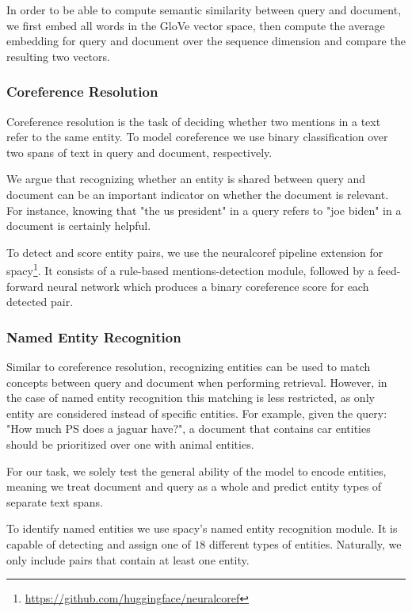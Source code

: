 In order to be able to compute semantic similarity between query and document, we first embed all words in the GloVe \cite{pennington2014glove} vector space, then compute the average embedding for query and document over the sequence dimension and compare the resulting two vectors.

\subsubsection{Coreference Resolution}
Coreference resolution is the task of deciding whether two mentions in a text refer to the same entity. To model coreference we use binary classification over two spans of text in query and document, respectively.

We argue that recognizing whether an entity is shared between query and document can be an important indicator on whether the document is relevant. For instance, knowing that "the us president" in a query refers to "joe biden" in a document is certainly helpful.

To detect and score entity pairs, we use the neuralcoref pipeline extension for spacy\footnote{\url{https://github.com/huggingface/neuralcoref}}. It consists of a rule-based mentions-detection module, followed by a feed-forward neural network which produces a binary coreference score for each detected pair.

\subsubsection{Named Entity Recognition}
Similar to coreference resolution, recognizing entities can be used to match concepts between query and document when performing retrieval. However, in the case of named entity recognition this matching is less restricted, as only entity  are considered instead of specific entities. For example, given the query: "How much PS does a jaguar have?", a document that contains car entities should be prioritized over one with animal entities.

For our task, we solely test the general ability of the model to encode entities, meaning we treat document and query as a whole and predict entity types of separate text spans.

To identify named entities we use spacy's \cite{spacy2} named entity recognition module. It is capable of detecting and assign one of $18$ different types of entities. Naturally, we only include pairs that contain at least one entity.


